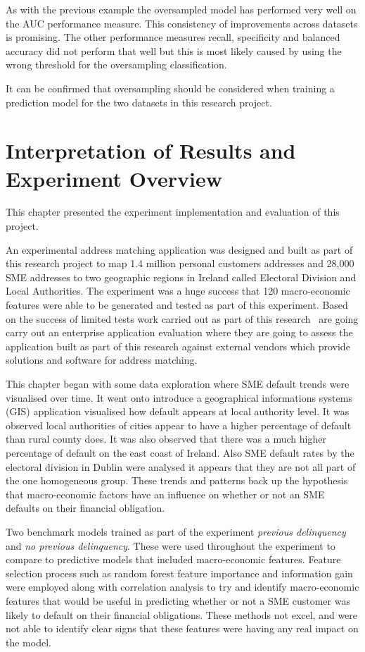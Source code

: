 As with the previous example the oversampled model has performed very well on the AUC performance measure. This consistency of improvements across datasets is promising. The other performance measures recall, specificity and balanced accuracy did not perform that well but this is most likely caused by using the wrong threshold for the oversampling classification. 

It can be confirmed that oversampling should be considered when training a prediction model for the two datasets in this research project.




\section{Interpretation of Results and Experiment Overview}
This chapter presented the experiment implementation and evaluation of this project. 

An experimental address matching application was designed and built as part of this research project to map 1.4 million personal customers addresses and 28,000 SME addresses to two geographic regions in Ireland called Electoral Division and Local Authorities. The experiment was a huge success that 120 macro-economic features were able to be generated and tested as part of this experiment. Based on the success of limited tests work carried out as part of this research \subjectname\ are going carry out an enterprise application evaluation where they are going to assess the application built as part of this research against external vendors which provide solutions and software for address matching.

This chapter began with some data exploration where SME default trends were visualised over time. It went onto introduce a geographical informations systems (GIS) application visualised how default appears at local authority level. It was observed local authorities of cities appear to have a higher percentage of default than rural county does. It was also observed that there was a much higher percentage of default on the east coast of Ireland. Also SME default rates by the electoral division in Dublin were analysed it appears that they are not all part of the one homogeneous group. These trends and patterns back up the hypothesis that macro-economic factors have an influence on whether or not an SME defaults on their financial obligation.

Two benchmark models trained as part of the experiment \textit{previous delinquency} and \textit{no previous delinquency}. These were used throughout the experiment to compare to predictive models that included macro-economic features. Feature selection process such as random forest feature importance and information gain were employed along with correlation analysis to try and identify macro-economic features that would be useful in predicting whether or not a SME customer was likely to default on their financial obligations. These methods not excel, and were not able to identify clear signs that these features were having any real impact on the model. 

